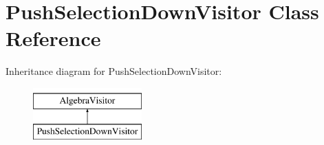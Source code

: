 \hypertarget{class_push_selection_down_visitor}{\section{Push\+Selection\+Down\+Visitor Class Reference}
\label{class_push_selection_down_visitor}
}
Inheritance diagram for Push\+Selection\+Down\+Visitor\+:\begin{figure}[H]
\begin{center}
\leavevmode
\includegraphics[height=2.000000cm]{class_push_selection_down_visitor}
\end{center}
\end{figure}
